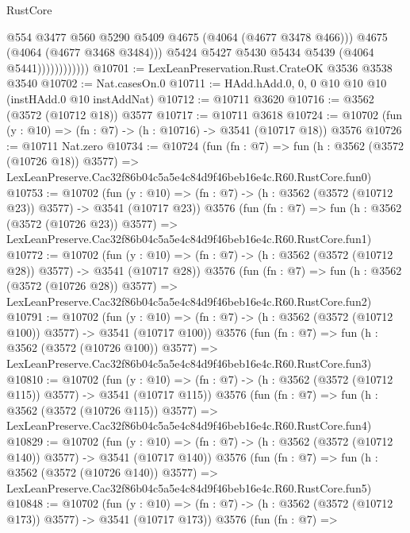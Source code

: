 \begin{lexlean}{RustCore}
\begin{coremodule}
                              @554
                              @3477
                              @560
                              @5290
                              @5409
                              @4675
                              (@4064 (@4677 @3478 @466)))
                            @4675
                            (@4064 (@4677 @3468 @3484)))
                          @5424
                          @5427
                          @5430
                          @5434
                          @5439
                          (@4064 @5441))))))))))))
@10701 := LexLeanPreservation.Rust.CrateOK @3536 @3538 @3540
@10702 := Nat.casesOn.{0}
@10711 := HAdd.hAdd.{0, 0, 0} @10 @10 @10 (instHAdd.{0} @10 instAddNat)
@10712 := @10711 @3620
@10716 := @3562 (@3572 (@10712 @18)) @3577
@10717 := @10711 @3618
@10724 := @10702 (fun (y : @10) => (fn : @7) -> (h : @10716) -> @3541 (@10717 @18)) @3576
@10726 := @10711 Nat.zero
@10734 := @10724
    (fun (fn : @7) =>
    fun (h : @3562 (@3572 (@10726 @18)) @3577) =>
    LexLeanPreserve.Cac32f86b04c5a5e4c84d9f46beb16e4c.R60.RustCore.fun0)
@10753 := @10702
    (fun (y : @10) => (fn : @7) -> (h : @3562 (@3572 (@10712 @23)) @3577) -> @3541 (@10717 @23))
    @3576
    (fun (fn : @7) =>
    fun (h : @3562 (@3572 (@10726 @23)) @3577) =>
    LexLeanPreserve.Cac32f86b04c5a5e4c84d9f46beb16e4c.R60.RustCore.fun1)
@10772 := @10702
    (fun (y : @10) => (fn : @7) -> (h : @3562 (@3572 (@10712 @28)) @3577) -> @3541 (@10717 @28))
    @3576
    (fun (fn : @7) =>
    fun (h : @3562 (@3572 (@10726 @28)) @3577) =>
    LexLeanPreserve.Cac32f86b04c5a5e4c84d9f46beb16e4c.R60.RustCore.fun2)
@10791 := @10702
    (fun (y : @10) => (fn : @7) -> (h : @3562 (@3572 (@10712 @100)) @3577) -> @3541 (@10717 @100))
    @3576
    (fun (fn : @7) =>
    fun (h : @3562 (@3572 (@10726 @100)) @3577) =>
    LexLeanPreserve.Cac32f86b04c5a5e4c84d9f46beb16e4c.R60.RustCore.fun3)
@10810 := @10702
    (fun (y : @10) => (fn : @7) -> (h : @3562 (@3572 (@10712 @115)) @3577) -> @3541 (@10717 @115))
    @3576
    (fun (fn : @7) =>
    fun (h : @3562 (@3572 (@10726 @115)) @3577) =>
    LexLeanPreserve.Cac32f86b04c5a5e4c84d9f46beb16e4c.R60.RustCore.fun4)
@10829 := @10702
    (fun (y : @10) => (fn : @7) -> (h : @3562 (@3572 (@10712 @140)) @3577) -> @3541 (@10717 @140))
    @3576
    (fun (fn : @7) =>
    fun (h : @3562 (@3572 (@10726 @140)) @3577) =>
    LexLeanPreserve.Cac32f86b04c5a5e4c84d9f46beb16e4c.R60.RustCore.fun5)
@10848 := @10702
    (fun (y : @10) => (fn : @7) -> (h : @3562 (@3572 (@10712 @173)) @3577) -> @3541 (@10717 @173))
    @3576
    (fun (fn : @7) =>

\end{coremodule}
\end{lexlean}
